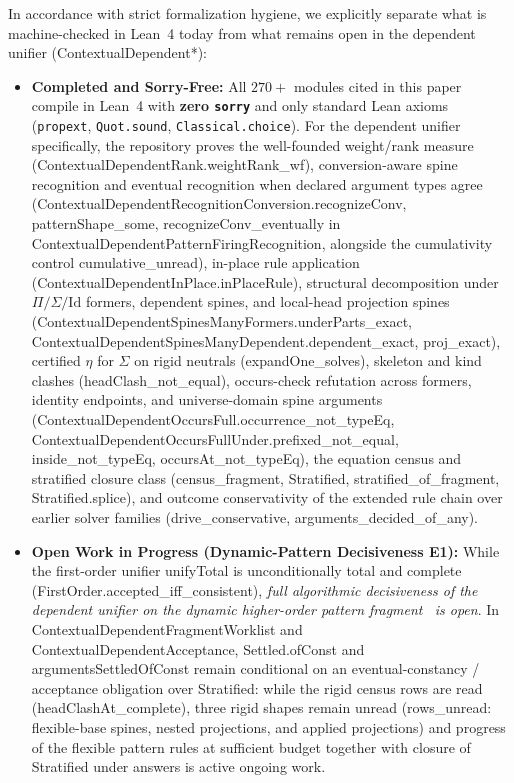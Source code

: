 \documentclass[11pt,a4paper]{article}
\theoremstyle{definition}
\DeclareRobustCommand{\lean}[1]{%
  \ifmmode\text{\normalfont\ttfamily\footnotesize\detokenize{#1}}%
  \else{\normalfont\footnotesize\leanurl{#1}}\fi}
\DeclareRobustCommand{\metta}[1]{\text{\normalfont\ttfamily\footnotesize #1}}
\def\lean#1{#1}%
\def\metta#1{#1}%
\begin{document}
In accordance with strict formalization hygiene, we explicitly separate what is machine-checked in Lean~4 today from what remains open in the dependent unifier (\lean{ContextualDependent*}):
\begin{itemize}[leftmargin=1.8em, nosep]
  \item \textbf{Completed and Sorry-Free:}
  All $270+$ modules cited in this paper compile in Lean~4 with \textbf{zero \texttt{sorry}} and only standard Lean axioms (\texttt{propext}, \texttt{Quot.sound}, \texttt{Classical.choice}). For the dependent unifier specifically, the repository proves the well-founded weight/rank measure (\lean{ContextualDependentRank.weightRank_wf}), conversion-aware spine recognition and eventual recognition when declared argument types agree (\lean{ContextualDependentRecognitionConversion.recognizeConv}, \lean{patternShape_some}, \lean{recognizeConv_eventually} in \lean{ContextualDependentPatternFiringRecognition}, alongside the cumulativity control \lean{cumulative_unread}), in-place rule application (\lean{ContextualDependentInPlace.inPlaceRule}), structural decomposition under $\Pi/\Sigma/\mathrm{Id}$ formers, dependent spines, and local-head projection spines (\lean{ContextualDependentSpinesManyFormers.underParts_exact}, \lean{ContextualDependentSpinesManyDependent.dependent_exact}, \lean{proj_exact}), certified $\eta$ for $\Sigma$ on rigid neutrals (\lean{expandOne_solves}), skeleton and kind clashes (\lean{headClash_not_equal}), occurs-check refutation across formers, identity endpoints, and universe-domain spine arguments (\lean{ContextualDependentOccursFull.occurrence_not_typeEq}, \lean{ContextualDependentOccursFullUnder.prefixed_not_equal}, \lean{inside_not_typeEq}, \lean{occursAt_not_typeEq}), the equation census and stratified closure class (\lean{census_fragment}, \lean{Stratified}, \lean{stratified_of_fragment}, \lean{Stratified.splice}), and outcome conservativity of the extended rule chain over earlier solver families (\lean{drive_conservative}, \lean{arguments_decided_of_any}).
  \item \textbf{Open Work in Progress (Dynamic-Pattern Decisiveness \metta{E1}):}
  While the first-order unifier \lean{unifyTotal} is unconditionally total and complete (\lean{FirstOrder.accepted_iff_consistent}), \emph{full algorithmic decisiveness of the dependent unifier on the dynamic higher-order pattern fragment~\cite{AbelPientka2011HigherOrder} is open}. In \lean{ContextualDependentFragmentWorklist} and \lean{ContextualDependentAcceptance}, \lean{Settled.ofConst} and \lean{argumentsSettledOfConst} remain conditional on an eventual-constancy / acceptance obligation over \lean{Stratified}: while the rigid census rows are read (\lean{headClashAt_complete}), three rigid shapes remain unread (\lean{rows_unread}: flexible-base spines, nested projections, and applied projections) and progress of the flexible pattern rules at sufficient budget together with closure of \lean{Stratified} under answers is active ongoing work.
\end{itemize}
\end{document}
